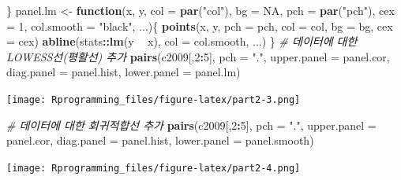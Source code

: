 \documentclass[10pt,]{krantz}
\makeatletter
\newenvironment{Shaded}{\begin{snugshade}}{\end{snugshade}}
\newcommand{\KeywordTok}[1]{\textcolor[rgb]{0.13,0.29,0.53}{\textbf{#1}}}
\newcommand{\DataTypeTok}[1]{\textcolor[rgb]{0.13,0.29,0.53}{#1}}
\newcommand{\DecValTok}[1]{\textcolor[rgb]{0.00,0.00,0.81}{#1}}
\newcommand{\StringTok}[1]{\textcolor[rgb]{0.31,0.60,0.02}{#1}}
\newcommand{\CommentTok}[1]{\textcolor[rgb]{0.56,0.35,0.01}{\textit{#1}}}
\newcommand{\OtherTok}[1]{\textcolor[rgb]{0.56,0.35,0.01}{#1}}
\newcommand{\ControlFlowTok}[1]{\textcolor[rgb]{0.13,0.29,0.53}{\textbf{#1}}}
\newcommand{\OperatorTok}[1]{\textcolor[rgb]{0.81,0.36,0.00}{\textbf{#1}}}
\newcommand{\NormalTok}[1]{#1}
\newenvironment{kframe}{%
\medskip{}
\setlength{\fboxsep}{.8em}
 \def\at@end@of@kframe{}%
 \ifinner\ifhmode%
  \def\at@end@of@kframe{\end{minipage}}%
  \begin{minipage}{\columnwidth}%
 \fi\fi%
 \def\FrameCommand##1{\hskip\@totalleftmargin \hskip-\fboxsep
 \colorbox{shadecolor}{##1}\hskip-\fboxsep
     \hskip-\linewidth \hskip-\@totalleftmargin \hskip\columnwidth}%
 \MakeFramed {\advance\hsize-\width
   \@totalleftmargin\z@ \linewidth\hsize
   \@setminipage}}%
 {\par\unskip\endMakeFramed%
 \at@end@of@kframe}
\renewenvironment{Shaded}{\begin{kframe}}{\end{kframe}}
\theoremstyle{definition}
\theoremstyle{definition}
\theoremstyle{remark}
\makeatother
\begin{document}
\begin{Shaded}
\begin{Highlighting}[]
\NormalTok{\}}
\NormalTok{panel.lm <-}\StringTok{ }\ControlFlowTok{function}\NormalTok{(x, y, }\DataTypeTok{col =} \KeywordTok{par}\NormalTok{(}\StringTok{"col"}\NormalTok{), }\DataTypeTok{bg =} \OtherTok{NA}\NormalTok{, }\DataTypeTok{pch =} \KeywordTok{par}\NormalTok{(}\StringTok{"pch"}\NormalTok{), }\DataTypeTok{cex =} \DecValTok{1}\NormalTok{, }\DataTypeTok{col.smooth =} \StringTok{"black"}\NormalTok{, ...)\{}
  \KeywordTok{points}\NormalTok{(x, y, }\DataTypeTok{pch =}\NormalTok{ pch, }\DataTypeTok{col =}\NormalTok{ col, }\DataTypeTok{bg =}\NormalTok{ bg, }\DataTypeTok{cex =}\NormalTok{ cex)}
  \KeywordTok{abline}\NormalTok{(stats}\OperatorTok{::}\KeywordTok{lm}\NormalTok{(y }\OperatorTok{~}\StringTok{ }\NormalTok{x), }\DataTypeTok{col =}\NormalTok{ col.smooth, ...)}
\NormalTok{\}}
\CommentTok{# 데이터에 대한 LOWESS선(평활선) 추가 }
\KeywordTok{pairs}\NormalTok{(c2009[,}\DecValTok{2}\OperatorTok{:}\DecValTok{5}\NormalTok{], }\DataTypeTok{pch =} \StringTok{"."}\NormalTok{, }\DataTypeTok{upper.panel =}\NormalTok{ panel.cor, }\DataTypeTok{diag.panel =}\NormalTok{ panel.hist, }\DataTypeTok{lower.panel =}\NormalTok{ panel.lm)}
\end{Highlighting}
\end{Shaded}

\texttt{[image: Rprogramming\_files/figure-latex/part2-3.png]}

\begin{Shaded}
\begin{Highlighting}[]


\CommentTok{# 데이터에 대한 회귀적합선 추가 }
\KeywordTok{pairs}\NormalTok{(c2009[,}\DecValTok{2}\OperatorTok{:}\DecValTok{5}\NormalTok{], }\DataTypeTok{pch =} \StringTok{"."}\NormalTok{, }\DataTypeTok{upper.panel =}\NormalTok{ panel.cor, }\DataTypeTok{diag.panel =}\NormalTok{ panel.hist, }\DataTypeTok{lower.panel =}\NormalTok{ panel.smooth)}
\end{Highlighting}
\end{Shaded}

\texttt{[image: Rprogramming\_files/figure-latex/part2-4.png]}

\begin{Shaded}
\end{Shaded}
\end{document}
